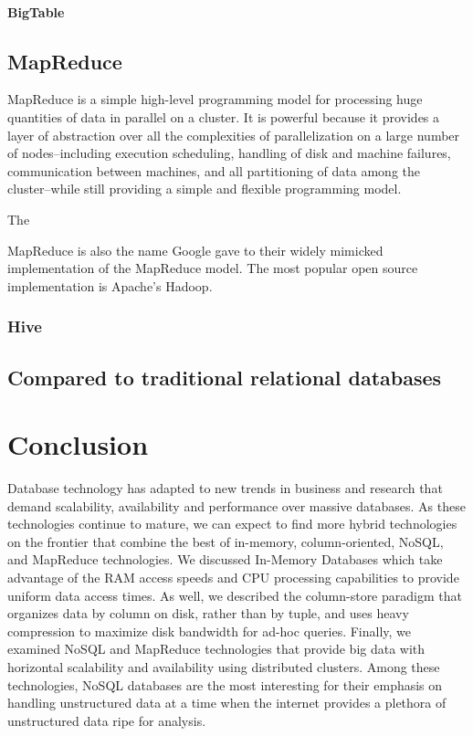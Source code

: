 \documentclass[11pt,a4paper]{report}
\begin{document}
\paragraph*{BigTable}

\subsection*{MapReduce}
MapReduce is a simple high-level programming model for processing huge quantities of data in parallel on a cluster. It is powerful because it provides a layer of abstraction over all the complexities of parallelization on a large number of nodes--including  execution scheduling, handling of disk and machine failures, communication between machines, and all partitioning of data among the cluster--while still providing a simple and flexible programming model.\cite{dean2008mapreduce}

The 

MapReduce is also the name Google gave to their widely mimicked implementation of the MapReduce model. The most popular open source implementation is Apache's Hadoop. 
\subsubsection*{Hive}

\subsection*{Compared to traditional relational databases}


\section{Conclusion}
Database technology has adapted to new trends in business and research that demand scalability, availability and performance over massive databases. As these technologies continue to mature, we can expect to find more hybrid technologies on the frontier that combine the best of in-memory, column-oriented, NoSQL, and MapReduce technologies. We discussed In-Memory Databases which take advantage of the RAM access speeds and CPU processing capabilities to provide uniform data access times. As well, we described the column-store paradigm that organizes data by column on disk, rather than by tuple, and uses heavy compression to maximize disk bandwidth for ad-hoc queries. Finally, we examined NoSQL and MapReduce technologies that provide big data with horizontal scalability and availability using distributed clusters. Among these technologies, NoSQL databases are the most interesting for their emphasis on handling unstructured data at a time when the internet provides a plethora of unstructured data ripe for analysis.
\pagebreak


\end{document}
